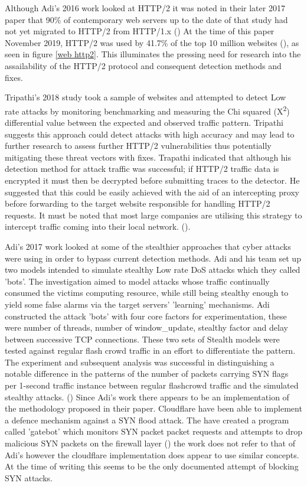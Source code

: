 
Although Adi's 2016 work looked at HTTP/2 it was noted in their later 2017 paper that 90\% of contemporary web servers up to the date of that study had not yet migrated to HTTP/2 from HTTP/1.x (\cite{adi2017stealthy}) At the time of this paper November 2019, HTTP/2 was used by 41.7\% of the top 10 million websites (\cite{w3techs}), as seen in figure \ref{web http2}. This illuminates the pressing need for research into the assailability of the HTTP/2 protocol and consequent detection methods and fixes. 
 
Tripathi's 2018 study took a sample of websites and attempted to detect Low rate attacks by monitoring benchmarking and measuring the Chi squared (X\textsuperscript{\small2}) differential value between the expected and observed traffic pattern. Tripathi suggests this approach could detect attacks with high accuracy and may lead to further research to assess further HTTP/2 vulnerabilities thus potentially mitigating these threat vectors with fixes. Trapathi indicated that although his detection method for attack traffic was successful; if HTTP/2 traffic data is encrypted it must then be decrypted before submitting traces to the detector. He suggested that this could be easily achieved with the aid of an intercepting proxy before forwarding to the target website responsible for handling HTTP/2 requests. It must be noted that most large companies are utilising this strategy to intercept traffic coming into their local network. (\cite{tripathi2018slow}). 

Adi's 2017 work looked at some of the stealthier approaches that cyber attacks were using in order to bypass current detection methods. Adi and his team set up two models intended to simulate stealthy Low rate DoS attacks which they called 'bots'. The investigation aimed to model attacks whose traffic continually consumed the victims computing resource, while still being stealthy enough to yield some false alarms via the target servers' 'learning' mechanisms. Adi constructed the attack 'bots' with four core factors for experimentation, these were number of threads, number of window\_update, stealthy factor and delay between successive TCP connections. These two sets of Stealth models were tested against regular flash crowd traffic in an effort to differentiate the pattern. The experiment and subsequent analysis was successful in distinguishing a notable difference in the patterns of the number of packets carrying SYN flags per 1-second traffic instance between regular flashcrowd traffic and the simulated stealthy attacks. (\cite{adi2017stealthy}) Since Adi's work there appears to be an implementation of the methodology proposed in their paper. Cloudflare have been able to implement a defence mechanism against a SYN flood attack. The have created a program called 'gatebot' which monitors SYN packet packet requests and attempts to drop malicious SYN packets on the firewall layer (\cite{CFSYN}) the work does not refer to that of Adi's however the cloudflare implementation does appear to use similar concepts. At the  time of writing this seems to be the only documented attempt of blocking SYN attacks.
